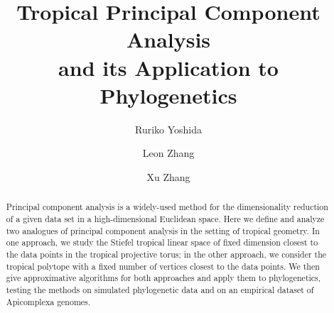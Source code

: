 \documentclass[12pt]{extarticle}
\date{}
\title{\textbf{Tropical Principal Component Analysis\\
 and its Application to Phylogenetics}}
\author{Ruriko Yoshida \and Leon Zhang \and Xu Zhang}
\numberwithin{theorem}{section}
\begin{document}
\maketitle

\begin{abstract}
Principal component analysis is a widely-used method for the dimensionality reduction of a given data set in a high-dimensional Euclidean space. Here we define and analyze two analogues of principal component analysis in the setting of tropical geometry. In one approach, we study the Stiefel tropical linear space of fixed dimension closest to the data points in the tropical projective torus; in the other approach, we consider the tropical polytope with a fixed number of vertices closest to the data points. We then give approximative algorithms for both approaches and apply them to phylogenetics, testing the methods on simulated phylogenetic data and on an empirical dataset of Apicomplexa genomes.

\end{abstract}
\end{document}
